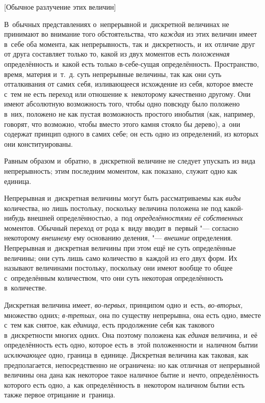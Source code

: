 %
{[Обычное разлучение этих величин]}

В~обычных представлениях о~непрерывной и~дискретной величинах не принимают во
внимание того обстоятельства, что {\em каждая} из этих величин имеет в~себе оба
момента, как непрерывность, так и~дискретность, и~их отличие друг от друга
составляет только то, какой из двух моментов есть {\em положенная}
определённость и~какой есть только в-себе-сущая определённость. Пространство,
время, материя и~т.~д. суть непрерывные величины, так как они суть отталкивания
от самих себя, изливающееся исхождение из себя, которое вместе с~тем не есть
переход или отношение к~некоторому качественно другому. Они имеют абсолютную
возможность того, чтобы одно повсюду было положено в~них, положено не как
пустая возможность простого инобытия (как, например, говорят, что возможно,
чтобы вместо этого камня стояло бы дерево), а~они содержат принцип одного в
самих себе; он есть одно из определений, из которых они конституированы.

Равным образом и~обратно, в~дискретной величине не следует упускать из вида
непрерывность; этим последним моментом, как показано, служит одно как единица.

Непрерывная и~дискретная величины могут быть рассматриваемы как {\em виды}
количества, но лишь постольку, поскольку величина положена не под какой-нибудь
внешней определённостью, а~под {\em определённостями её собственных} моментов.
Обычный переход от рода к~виду вводит в~первый "--- согласно некоторому
{\em внешнему} ему основанию деления, "--- {\em внешние} определения.
Непрерывная и~дискретная величины при этом ещё не суть определённые величины;
они суть лишь само количество в~каждой из его двух форм. Их называют величинами
постольку, поскольку они имеют вообще то общее с~определённым количеством, что
они суть некоторая определённость в~количестве.


Дискретная величина имеет, {\em во-первых,} принципом одно и~есть,
{\em во-вторых,} множество одних; {\em в-третьих,} она по существу непрерывна,
она есть одно, вместе с~тем как снятое, как {\em единица,} есть продолжение
себя как такового в~дискретности многих одних. Она поэтому положена как
{\em единая} величина, и~её определённость есть одно, которое есть в~этой
положенности и~наличном бытии {\em исключающее} одно, граница в~единице.
Дискретная величина как таковая, как предполагается, непосредственно не
ограничена: но как отличная от непрерывной величины она дана как некоторое
такое наличное бытие и~нечто, определённость которого есть одно, а~как
определённость в~некотором наличном бытии есть также первое
отрицание и~граница.

